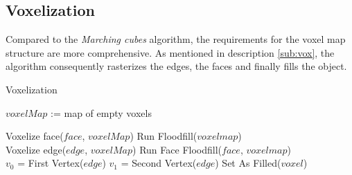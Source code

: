 \subsection{Voxelization}

Compared to the \emph{Marching cubes} algorithm, the requirements for the voxel map structure
are more comprehensive. As mentioned in description \ref{sub:vox}, the algorithm consequently rasterizes
the edges, the faces and finally fills the object.

\begin{algorithm}[H]
\caption{Voxelization}
\label{alg:vox}
\begin{algorithmic}[1]
			\State $voxelMap$ := map of empty voxels

			\State Voxelize face($face$, $voxelMap$)
		\EndParallelFor
		\State Run Floodfill($voxel map$)
		\State {}
	\EndFunction
	\\
			\State Voxelize edge($edge$, $voxelMap$)
		\EndFor
		\State Run Face Floodfill($face$, $voxel map$)
	\EndFunction
	\\
		\State $v_{0}$ = First Vertex($edge$)
		\State $v_{1}$ = Second Vertex($edge$)
			\State Set As Filled($voxel$)
		\EndFor
	\EndFunction
\end{algorithmic}
\end{algorithm}